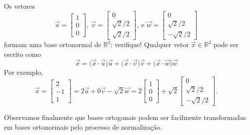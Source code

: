 \documentclass[../livro.tex]{subfiles}  %
\begin{document}
\begin{example}
	Os vetores
	\begin{equation}
	\vec{u} =
	\begin{bmatrix}
	1 \\ 0 \\ 0
	\end{bmatrix}, \
	\vec{v} =
	\begin{bmatrix}
	0 \\ \sqrt{2}/2 \\ \sqrt{2}/2
	\end{bmatrix}, \ \text{e }
	\vec{w} =
	\begin{bmatrix}
	0 \\ \sqrt{2}/2 \\ - \sqrt{2}/2
	\end{bmatrix}
	\end{equation} formam uma base ortonormal de $\mathbb{R}^3$: verifique! Qualquer vetor $\vec{x} \in \mathbb{R}^3$ pode ser escrito como 
	\begin{equation}
	\vec{x} = \big( \vec{x} \cdot \vec{u} \big) \vec{u} + \big( \vec{x} \cdot \vec{v} \big) \vec{v} + \big( \vec{x} \cdot \vec{w} \big) \vec{w}
	\end{equation} Por exemplo,
	\begin{equation}
	\vec{x} =
	\begin{bmatrix}
	2 \\ -1 \\ 1
	\end{bmatrix} = 2 \vec{u} + 0 \vec{v} - \sqrt{2} \vec{w} = 2 
	\begin{bmatrix}
	1 \\ 0 \\ 0
	\end{bmatrix} + \sqrt{2} 
	\begin{bmatrix}
	0 \\ \sqrt{2}/2 \\ - \sqrt{2}/2
	\end{bmatrix}.
	\end{equation}
\end{example}


Observamos finalmente que bases ortogonais podem ser facilmente transformadas em bases ortonormais pelo processo de normalização.
\end{document}
